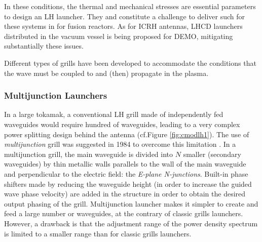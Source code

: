 In these conditions, the thermal and mechanical stresses are essential parameters to design an LH launcher. They and constitute a challenge to deliver such for these systems in for fusion reactors. As for ICRH antennas, LHCD launchers distributed in the vacuum vessel is being proposed for DEMO, mitigating substantially these issues.

Different types of grills have been developed to accommodate the conditions that the wave must be coupled to and (then) propagate in the plasma. 

%

\subsubsection{Multijunction Launchers}\label{sec:multijunction}
In a large tokamak, a conventional LH grill made of independently fed waveguides would require hundred of waveguides, leading to a very complex power splitting design behind the antenna (cf.Figure \ref{fig:cmodlh1}). The use of \emph{multijunction} grill was suggested in 1984 to overcome this limitation . In a multijunction grill, the main waveguide is divided into $N$ smaller (secondary waveguides) by thin metallic walls parallels to the wall of the main waveguide and perpendicular to the electric field: the \emph{E-plane N-junctions}. Built-in phase shifters made by reducing the waveguide height (in order to increase the guided wave phase velocity) are added in the structure in order to obtain the desired output phasing of the grill. Multijunction launcher makes it simpler to create and feed a large number or waveguides, at the contrary of classic grills launchers. However, a drawback is that the adjustment range of the power density spectrum is limited to a smaller range than for classic grills launchers.

